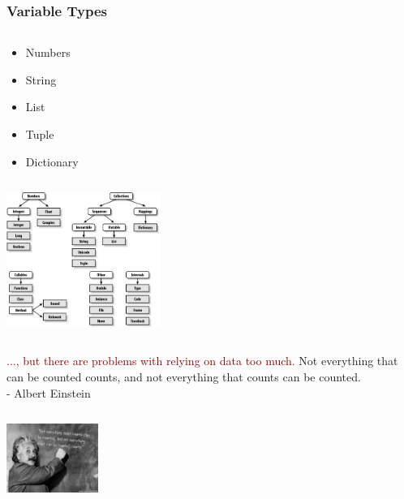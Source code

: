 \documentclass{beamer}
\begin{document}
\begin{frame}
\frametitle{Variable Types}
\begin{columns}[c]
	\begin{column}{30cm}
		\vspace{.1cm}
		\begin{itemize}
			\justifying
			\item Numbers
			\item String
			\item List
			\item Tuple
			\item Dictionary
		\end{itemize}
	\end{column}
\end{columns}
	\vspace{.5cm}
	\hspace*{5.5cm} \includegraphics[width=5cm]{figs/python-types.jpg}
\end{frame}

\begin{frame}
\begin{columns}
\column{28em}
\vspace{2cm}
\begin{block}{\centering\textcolor{darkred}{..., but there are problems with relying on data too much.}}
\justifying
Not everything that can be counted counts, and not everything that counts can be counted.\\
\vspace{.2cm}
\hspace*{8.5cm}\footnotesize{- Albert Einstein}
\end{block}
\end{columns}
\vspace{.75cm}
\hspace*{8.5cm}\includegraphics[width=3cm]{figs/einstein.pdf}
\end{frame}
\end{document}
